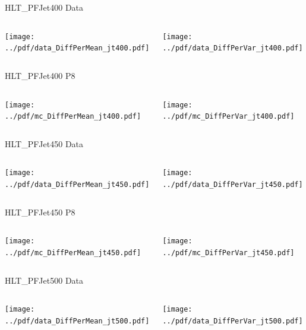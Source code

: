 \documentclass[9pt]{beamer}
\begin{document}
\begin{frame}[t]{HLT\_PFJet400 Data}
\begin{columns}[T]
  \begin{column}{.5\textwidth}
  \texttt{[image: ../pdf/data\_DiffPerMean\_jt400.pdf]}
  \end{column}
  \begin{column}{.5\textwidth}
  \texttt{[image: ../pdf/data\_DiffPerVar\_jt400.pdf]}
  \end{column}
\end{columns}
\end{frame}

\begin{frame}[t]{HLT\_PFJet400 P8}
\begin{columns}[T]
  \begin{column}{.5\textwidth}
  \texttt{[image: ../pdf/mc\_DiffPerMean\_jt400.pdf]}
  \end{column}
  \begin{column}{.5\textwidth}
  \texttt{[image: ../pdf/mc\_DiffPerVar\_jt400.pdf]}
  \end{column}
\end{columns}
\end{frame}

\begin{frame}[t]{HLT\_PFJet450 Data}
\begin{columns}[T]
  \begin{column}{.5\textwidth}
  \texttt{[image: ../pdf/data\_DiffPerMean\_jt450.pdf]}
  \end{column}
  \begin{column}{.5\textwidth}
  \texttt{[image: ../pdf/data\_DiffPerVar\_jt450.pdf]}
  \end{column}
\end{columns}
\end{frame}

\begin{frame}[t]{HLT\_PFJet450 P8}
\begin{columns}[T]
  \begin{column}{.5\textwidth}
  \texttt{[image: ../pdf/mc\_DiffPerMean\_jt450.pdf]}
  \end{column}
  \begin{column}{.5\textwidth}
  \texttt{[image: ../pdf/mc\_DiffPerVar\_jt450.pdf]}
  \end{column}
\end{columns}
\end{frame}

\begin{frame}[t]{HLT\_PFJet500 Data}
\begin{columns}[T]
  \begin{column}{.5\textwidth}
  \texttt{[image: ../pdf/data\_DiffPerMean\_jt500.pdf]}
  \end{column}
  \begin{column}{.5\textwidth}
  \texttt{[image: ../pdf/data\_DiffPerVar\_jt500.pdf]}
  \end{column}
\end{columns}
\end{frame}
\end{document}

